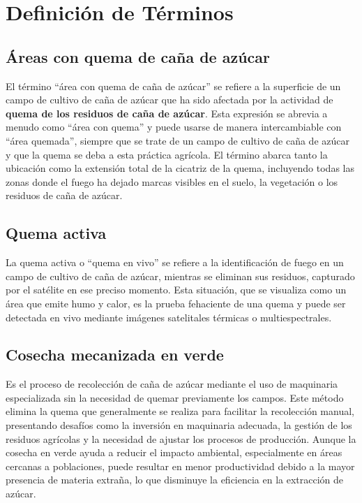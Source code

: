 \section{Definición de Términos}

\subsection{Áreas con quema de caña de azúcar}
El término ``área con quema de caña de azúcar'' se refiere a la superficie de un campo de cultivo de caña de azúcar que ha sido afectada por la actividad de \textbf{quema de los residuos de caña de azúcar}. Esta expresión se abrevia a menudo 
como ``área con quema'' y puede usarse de manera intercambiable con ``área quemada'', siempre que se trate de un campo de cultivo de caña de azúcar y que la quema se deba a esta práctica agrícola. El término abarca tanto la ubicación como 
la extensión total de la cicatriz de la quema, incluyendo todas las zonas donde el fuego ha dejado marcas visibles en el suelo, la vegetación o los residuos de caña de azúcar.

\subsection{Quema activa}

La quema activa o ``quema en vivo'' se refiere a la identificación de fuego en un campo de cultivo de caña de azúcar, mientras se eliminan sus residuos, capturado por el satélite en ese preciso momento. Esta situación, que se visualiza como un área 
que emite humo y calor, es la prueba fehaciente de una quema y puede ser detectada en vivo mediante imágenes satelitales térmicas o multiespectrales.

\subsection{Cosecha mecanizada en verde}
Es el proceso de recolección de caña de azúcar mediante el uso de maquinaria especializada sin la necesidad de quemar previamente los campos. Este método elimina la quema que generalmente se realiza para facilitar la recolección manual, presentando 
desafíos como la inversión en maquinaria adecuada, la gestión de los residuos agrícolas y la necesidad de ajustar los procesos de producción. Aunque la cosecha en verde ayuda a reducir el impacto ambiental, especialmente en áreas cercanas a poblaciones, 
puede resultar en menor productividad debido a la mayor presencia de materia extraña, lo que disminuye la eficiencia en la extracción de azúcar.

